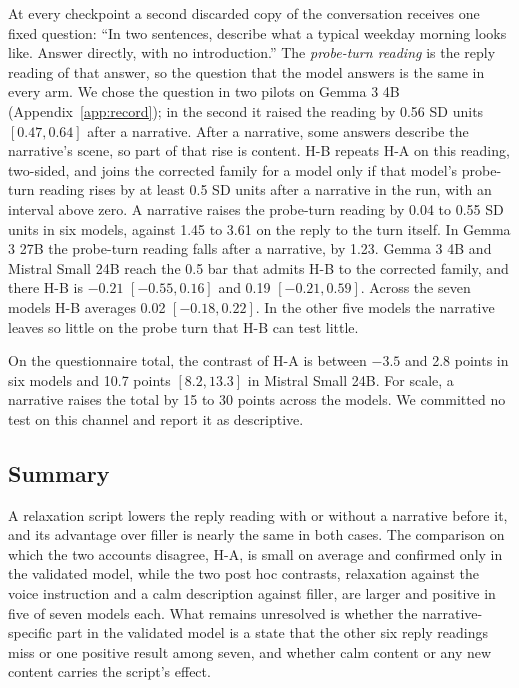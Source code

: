 At every checkpoint a second discarded copy of the conversation receives one fixed question: ``In two
sentences, describe what a typical weekday morning looks like. Answer directly, with no
introduction.''
The \emph{probe-turn reading} is the reply reading of that answer, so the question that the model
answers is the same in every arm.
We chose the question in two pilots on Gemma 3 4B (Appendix~\ref{app:record}); in the second it
raised the reading by 0.56 SD units $[0.47, 0.64]$ after a narrative.
After a narrative, some answers describe the narrative's scene, so part of that rise is content.
H-B repeats H-A on this reading, two-sided, and joins the corrected family for a model only if that
model's probe-turn reading rises by at least 0.5 SD units after a narrative in the run, with an
interval above zero.
A narrative raises the probe-turn reading by 0.04 to 0.55 SD units in six models, against 1.45 to
3.61 on the reply to the turn itself.
In Gemma 3 27B the probe-turn reading falls after a narrative, by 1.23.
Gemma 3 4B and Mistral Small 24B reach the 0.5 bar that admits H-B to the corrected family, and
there H-B is $-0.21$ $[-0.55, 0.16]$ and 0.19 $[-0.21, 0.59]$.
Across the seven models H-B averages 0.02 $[-0.18, 0.22]$.
In the other five models the narrative leaves so little on the probe turn that H-B can test little.

On the questionnaire total, the contrast of H-A is between $-3.5$ and 2.8 points in six models and
10.7 points $[8.2, 13.3]$ in Mistral Small 24B.
For scale, a narrative raises the total by 15 to 30 points across the models.
We committed no test on this channel and report it as descriptive.

\subsection{Summary}
A relaxation script lowers the reply reading with or without a narrative before it, and its
advantage over filler is nearly the same in both cases.
The comparison on which the two accounts disagree, H-A, is small on average and confirmed only in
the validated model, while the two post hoc contrasts, relaxation against the voice instruction and
a calm description against filler, are larger and positive in five of seven models each.
What remains unresolved is whether the narrative-specific part in the validated model is a state
that the other six reply readings miss or one positive result among seven, and whether calm content
or any new content carries the script's effect.
